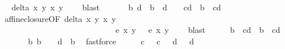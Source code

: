 \begin{isabellebody}
\ \isamarkupfalse%
\ {\isachardoublequoteopen}delta\ x{}\ y{}\ x{}\ y{}\ {\isacharequal}\ {}{\isachardoublequoteclose}\ \isamarkupfalse%
\ blast\isanewline
\ \ \isamarkupfalse%
\ \isamarkupfalse%
\ {\isachardoublequoteopen}{\isasymexists}\ b{\isachardot}\ {\isacharparenleft}{}{\isacharslash}d\ {\isacharequal}\ b{\isacharcircum}{}\ {\isasymand}\ {}{\isacharslash}d\ {\isasymnoteq}\ {}{\isacharparenright}\ {\isasymor}\ {\isacharparenleft}{}{\isacharslash}{\isacharparenleft}c{\isacharasterisk}d{\isacharparenright}\ {\isacharequal}\ b{\isacharcircum}{}\ {\isasymand}\ {}{\isacharslash}{\isacharparenleft}c{\isacharasterisk}d{\isacharparenright}\ {\isasymnoteq}\ {}{\isacharparenright}{\isachardoublequoteclose}\ \isanewline
\ \ \ \isamarkupfalse%
\ affine{\isacharunderscore}closure{\isacharbrackleft}OF\ {\isacartoucheopen}delta\ x{}\ y{}\ x{}\ y{}\ {\isacharequal}\ {}{\isacartoucheclose}\ \isanewline
\ \ \ \ \ \ \ \ \ \ \ \ \ \ \ \ \ \ \ \ \ \ \ \ \ \ \ \ {\isacartoucheopen}e\ x{}\ y{}\ {\isacharequal}\ {}{\isacartoucheclose}\ {\isacartoucheopen}e\ x{}\ y{}\ {\isacharequal}\ {}{\isacartoucheclose}{\isacharbrackright}\ \isamarkupfalse%
\ blast\isanewline
\ \ \isamarkupfalse%
\ \isamarkupfalse%
\ b\ \ {\isachardoublequoteopen}{\isacharparenleft}{}{\isacharslash}{\isacharparenleft}c{\isacharasterisk}d{\isacharparenright}\ {\isacharequal}\ b{\isacharcircum}{}\ {\isasymand}\ {}{\isacharslash}{\isacharparenleft}c{\isacharasterisk}d{\isacharparenright}\ {\isasymnoteq}\ {}{\isacharparenright}{\isachardoublequoteclose}\isanewline
\ \ \ \isamarkupfalse%
\ {\isacartoucheopen}{\isasymnot}\ {\isacharparenleft}{\isasymexists}\ b{\isachardot}\ b\ {\isasymnoteq}\ {}\ {\isasymand}\ {}{\isacharslash}d\ {\isacharequal}\ b{\isacharcircum}{}{\isacharparenright}{\isacartoucheclose}\ \isamarkupfalse%
\ fastforce\isanewline
\ \ \isamarkupfalse%
\ \isamarkupfalse%
\ {\isachardoublequoteopen}{}{\isacharslash}c\ {\isasymnoteq}\ {}{\isachardoublequoteclose}\ {\isachardoublequoteopen}c\ {\isasymnoteq}\ {}{\isachardoublequoteclose}\ {\isachardoublequoteopen}d\ {\isasymnoteq}\ {}{\isachardoublequoteclose}\ {\isachardoublequoteopen}{}{\isacharslash}d\ {\isasymnoteq}\ {}{\isachardoublequoteclose}\ \isamarkupfalse%

\end{isabellebody}
